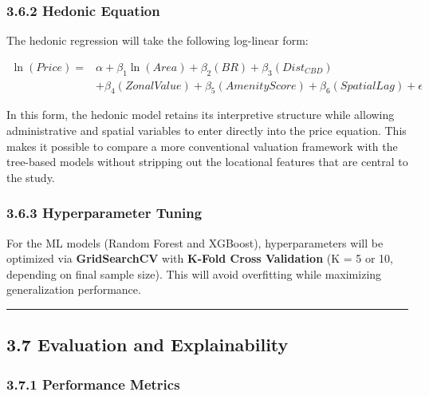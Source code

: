 \subsubsection{\texorpdfstring{\textbf{3.6.2 Hedonic Equation}}{3.6.2 Hedonic Equation}}\label{hedonic-equation}

The hedonic regression will take the following log-linear form:

\[
\begin{aligned}
\ln(Price) ={}& \alpha + \beta_1 \ln(Area) + \beta_2(BR) + \beta_3(Dist_{CBD}) \\
& + \beta_4(ZonalValue) + \beta_5(AmenityScore) + \beta_6(SpatialLag) + \epsilon
\end{aligned}
\]

In this form, the hedonic model retains its interpretive structure while allowing administrative and spatial variables to enter directly into the price equation. This makes it possible to compare a more conventional valuation framework with the tree-based models without stripping out the locational features that are central to the study.

\subsubsection{\texorpdfstring{\textbf{3.6.3 Hyperparameter Tuning}}{3.6.3 Hyperparameter Tuning}}\label{hyperparameter-tuning}

For the ML models (Random Forest and XGBoost), hyperparameters will be optimized via \textbf{GridSearchCV} with \textbf{K-Fold Cross Validation} (K = 5 or 10, depending on final sample size). This will avoid overfitting while maximizing generalization performance.

\begin{center}\rule{0.5\linewidth}{0.5pt}\end{center}

\subsection{\texorpdfstring{\textbf{3.7 Evaluation and Explainability}}{3.7 Evaluation and Explainability}}\label{evaluation-and-explainability}

\subsubsection{\texorpdfstring{\textbf{3.7.1 Performance Metrics}}{3.7.1 Performance Metrics}}\label{performance-metrics}

